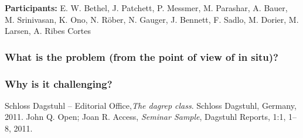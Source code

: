 
\license

\textbf{\sffamily Participants:} E. W. Bethel, J. Patchett, P. Messmer, M. Parashar, A. Bauer, M. Srinivasan, K. Ono, N. Röber, N. Gauger, J. Bennett, F. Sadlo, M. Dorier, M. Larsen, A. Ribes Cortes

\subsubsection*{What is the problem (from the point of view of in situ)?}
\subsubsection*{Why is it challenging?}

\begin{thebibliography}{0}
 Schloss Dagstuhl -- Editorial Office,\textsl{The dagrep class}. Schloss Dagstuhl, Germany, 2011.
 John Q. Open; Joan R. Access, \textsl{Seminar Sample}, Dagstuhl Reports, 1:1, 1--8, 2011.
\end{thebibliography}



